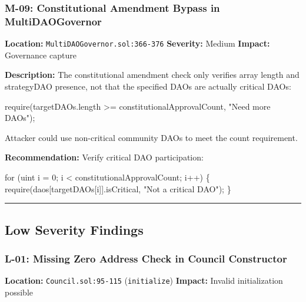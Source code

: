 \documentclass[
]{article}
\newenvironment{Shaded}{}{}
\newcommand{\NormalTok}[1]{#1}
\begin{document}
\subsubsection{M-09: Constitutional Amendment Bypass in
MultiDAOGovernor}\label{m-09-constitutional-amendment-bypass-in-multidaogovernor}

\textbf{Location:} \texttt{MultiDAOGovernor.sol:366-376}
\textbf{Severity:} Medium \textbf{Impact:} Governance capture

\textbf{Description:} The constitutional amendment check only verifies
array length and strategyDAO presence, not that the specified DAOs are
actually critical DAOs:

\begin{Shaded}
\begin{Highlighting}[]
\NormalTok{require(targetDAOs.length \textgreater{}= constitutionalApprovalCount, "Need more DAOs");}
\end{Highlighting}
\end{Shaded}

Attacker could use non-critical community DAOs to meet the count
requirement.

\textbf{Recommendation:} Verify critical DAO participation:

\begin{Shaded}
\begin{Highlighting}[]
\NormalTok{for (uint i = 0; i \textless{} constitutionalApprovalCount; i++) \{}
\NormalTok{    require(daos[targetDAOs[i]].isCritical, "Not a critical DAO");}
\NormalTok{\}}
\end{Highlighting}
\end{Shaded}

\begin{center}\rule{0.5\linewidth}{0.5pt}\end{center}

\subsection{Low Severity Findings}\label{low-severity-findings}

\subsubsection{L-01: Missing Zero Address Check in Council
Constructor}\label{l-01-missing-zero-address-check-in-council-constructor}

\textbf{Location:} \texttt{Council.sol:95-115} (\texttt{initialize})
\textbf{Impact:} Invalid initialization possible
\end{document}

